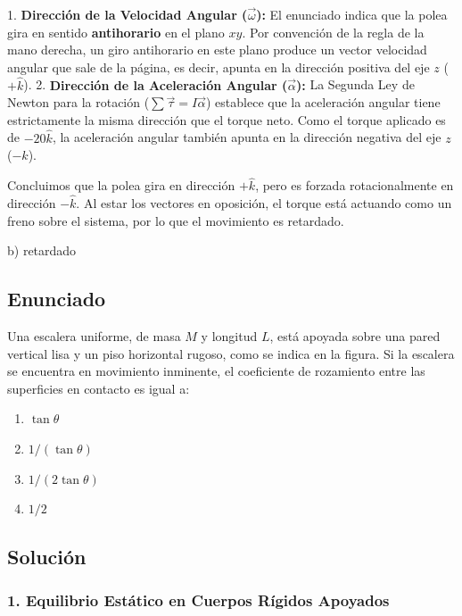 \documentclass[12pt, a4paper]{article}
\begin{document}
1. \textbf{Dirección de la Velocidad Angular ($\vec{\omega}$):} El enunciado indica que la polea gira en sentido \textbf{antihorario} en el plano $xy$. Por convención de la regla de la mano derecha, un giro antihorario en este plano produce un vector velocidad angular que sale de la página, es decir, apunta en la dirección positiva del eje $z$ ($+\hat{k}$).
2. \textbf{Dirección de la Aceleración Angular ($\vec{\alpha}$):} La Segunda Ley de Newton para la rotación ($\sum \vec{\tau} = I \vec{\alpha}$) establece que la aceleración angular tiene estrictamente la misma dirección que el torque neto. Como el torque aplicado es de $-20\hat{k}$, la aceleración angular también apunta en la dirección negativa del eje $z$ ($-\hat{k}$).

Concluimos que la polea gira en dirección $+\hat{k}$, pero es forzada rotacionalmente en dirección $-\hat{k}$. Al estar los vectores en oposición, el torque está actuando como un freno sobre el sistema, por lo que el movimiento es retardado.

\begin{tcolorbox}[colback=green!5!white, colframe=green!50!black, title=Respuesta Final]
\centering \Large b) retardado
\end{tcolorbox}

\newpage

\subsection*{Enunciado}
Una escalera uniforme, de masa $M$ y longitud $L$, está apoyada sobre una pared vertical lisa y un piso horizontal rugoso, como se indica en la figura. Si la escalera se encuentra en movimiento inminente, el coeficiente de rozamiento entre las superficies en contacto es igual a:
\begin{enumerate}[label=\alph*)]
    \item $\tan \theta$
    \item $1/(\tan \theta)$
    \item $1/(2\tan \theta)$
    \item $1/2$
\end{enumerate}

\subsection*{Solución}

\subsubsection*{1. Equilibrio Estático en Cuerpos Rígidos Apoyados}
\end{document}
